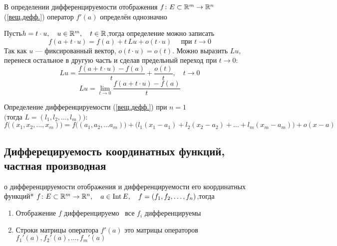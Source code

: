 \begin{utv}[https://www.youtube.com/live/4EMkUsyQQec?si=0fMr1jMMAaXiihPe&t=8668]
	В определении дифференцируемости отображения $f \colon E \subset \mathbb R^m \to \mathbb R^n$ (\ref{вещ.дефф.}) оператор $f'(a)$ определён однозначно
\end{utv} %

\begin{prf} %
	Пусть\quad $h = t \cdot u,\quad u \in \mathbb R^m,\quad t \in \mathbb R$,\quad тогда определение можно записать
	\[f(a + t\cdot u) = f(a) + t\, Lu + o(t \cdot u) \quad \text{ при } t \to 0\]
	Так как $u$ --- фиксированный вектор, $o(t\cdot u) = o(t)$. Можно выразить $Lu$, перенеся остальное в другую часть и сделав предельный переход при $t \to 0$:
	\[Lu = \frac{f(a + t\cdot u) - f(a)}{t} + \frac{o(t)}{t}, \quad t \to 0\]
	\[Lu = \lim_{t \to 0} \frac{f(a + t\cdot u) - f(a)}{t}\]
\end{prf} %

\begin{zam}[https://www.youtube.com/live/4EMkUsyQQec?si=AKhiCvQ6hFwjJs53&t=8943]\label{дефф.1}
	Определение дифференцируемости (\ref{вещ.дефф.}) при $n = 1$ $\bigr(\text{тогда } L=(l_1, l_2, \dots, l_m)\bigl)$:
	\[f\bigl((x_1, x_2, \dots, x_m)\bigr) = f\bigl((a_1, a_2, \dots a_m)\bigr) + \bigl(l_1(x_1 - a_1) + l_2(x_2 - a_2) + \dots + l_m(x_m - a_m)\bigr) + o(x - a)\]
\end{zam}%

\subsection{Дифферецируемость координатных функций, частная производная}

\begin{lem}[https://www.youtube.com/live/4EMkUsyQQec?si=Yn2iSTItfMzy3zqh&t=9366]{\small о дифференцируемости отображения и дифференцируемости его координатных функций}*
	\label{дефф.коорд.ф.}
	$f \colon E \subset \mathbb R^m \to \mathbb R^n,\quad a \in \mathrm{Int}\, E,\quad f = (f_1, f_2, \dots, f_n)$,\quad тогда
	\begin{enumerate}
		\item Отображение $f$ дифференцируемо \eq\ все $f_i$ дифференцируемы 
		
		\item Строки матрицы оператора $f'(a)$ это матрицы операторов $f_1'(a), f_2'(a), \dots, f_m'(a)$
	\end{enumerate}
\end{lem}%

